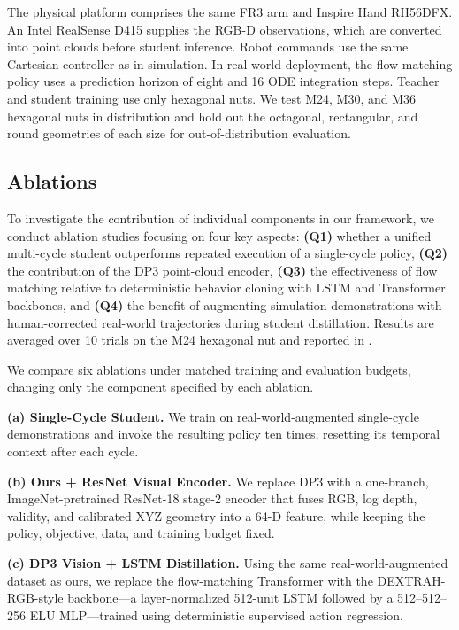 The physical platform comprises the same FR3 arm and Inspire Hand RH56DFX. An
Intel RealSense D415 supplies the RGB-D observations, which are converted into
point clouds before student inference. Robot
commands use the same Cartesian controller as in simulation. In real-world
deployment, the flow-matching policy uses a prediction horizon of eight and 16
ODE integration steps. Teacher and student training use only hexagonal nuts.
We test M24, M30, and M36 hexagonal nuts in distribution and hold out the
octagonal, rectangular, and round geometries of each size for
out-of-distribution evaluation.


\subsection{Ablations}

To investigate the contribution of individual components in our framework, we
conduct ablation studies focusing on four key aspects: \textbf{(Q1)} whether a
unified multi-cycle student outperforms repeated execution of a single-cycle
policy, \textbf{(Q2)} the contribution of the DP3 point-cloud encoder,
\textbf{(Q3)} the effectiveness of flow matching relative to deterministic
behavior cloning with LSTM and Transformer backbones, and
\textbf{(Q4)} the benefit of augmenting simulation demonstrations with
human-corrected real-world trajectories during student distillation. Results
are averaged over 10 trials on the M24 hexagonal nut and reported in
.

We compare six ablations under matched training and evaluation budgets,
changing only the component specified by each ablation.

\noindent\textbf{(a) Single-Cycle Student.}
We train on real-world-augmented single-cycle demonstrations and invoke the
resulting policy ten times, resetting its temporal context after each cycle.

\noindent\textbf{(b) Ours + ResNet Visual Encoder.}
We replace DP3 with a one-branch, ImageNet-pretrained ResNet-18 stage-2 encoder
that fuses RGB, log depth, validity, and calibrated XYZ geometry into a 64-D
feature, while keeping the policy, objective, data, and training budget fixed.

\noindent\textbf{(c) DP3 Vision + LSTM Distillation.}
Using the same real-world-augmented dataset as ours, we replace the
flow-matching Transformer with the DEXTRAH-RGB\cite{dextrahrgb}-style
backbone---a layer-normalized
512-unit LSTM followed by a 512--512--256 ELU MLP---trained using deterministic
supervised action regression.

